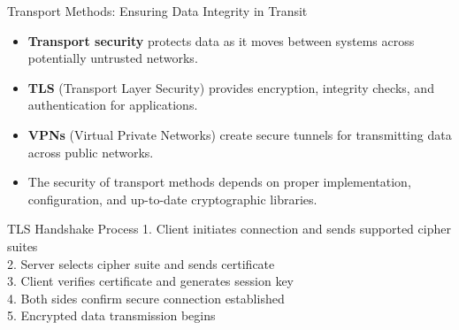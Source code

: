\documentclass{beamer}
\begin{document}
                \begin{frame}{Transport Methods: Ensuring Data Integrity in Transit}
                \begin{itemize}
                    \item \textbf{Transport security} protects data as it moves between systems across potentially untrusted networks.
                    \item \textbf{TLS} (Transport Layer Security) provides encryption, integrity checks, and authentication for applications.
                    \item \textbf{VPNs} (Virtual Private Networks) create secure tunnels for transmitting data across public networks.
                    \item The security of transport methods depends on proper implementation, configuration, and up-to-date cryptographic libraries.
                \end{itemize}
                
                \begin{exampleblock}{TLS Handshake Process}
                1. Client initiates connection and sends supported cipher suites\\
                2. Server selects cipher suite and sends certificate\\
                3. Client verifies certificate and generates session key\\
                4. Both sides confirm secure connection established\\
                5. Encrypted data transmission begins
                \end{exampleblock}
                \end{frame}
\end{document}
